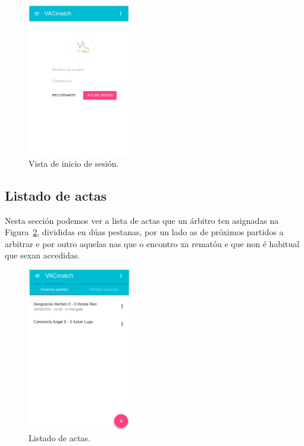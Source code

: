       \begin{figure}[h!]
        \begin{center}
        \includegraphics[width=0.4\textwidth]{./img/demo/6_login.png}
        \caption{Vista de inicio de sesión.}
        \label{fig:design:login}
        \end{center}
      \end{figure}

    \subsection{Listado de actas}
    Nesta sección podemos ver a lista de actas que un árbitro ten 
asignadas na Figura~\ref{fig:design:listreports}, divididas en dúas pestanas, 
por un lado as de próximos partidos a 
arbitrar e por outro aquelas nas que o encontro xa rematóu e que non é habitual 
que sexan accedidas.

      \begin{figure}[h!]
        \begin{center}
        \includegraphics[width=0.4\textwidth]{./img/demo/7_reportlist.png}
        \caption{Listado de actas.}
        \label{fig:design:listreports}
        \end{center}
      \end{figure}


